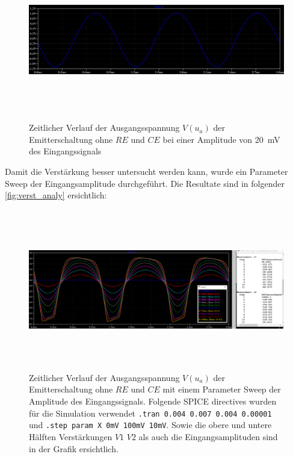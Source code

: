 \documentclass[12pt,english,ngerman]{scrartcl}
\begin{document}
\begin{figure}[H]
    \centering
    \includegraphics[width=\linewidth, height=7cm]{./figures/ohnekondundre/ausgangsignal10mv.png}
    \caption{Zeitlicher Verlauf der Ausgangsspannung $V(u_a)$
    der Emitterschaltung ohne $RE$ und $CE$ bei einer Amplitude von
  \SI{20}{mV} des Eingangssignals}
    \label{fig:sim_ohne_re_normal_ausgang}
\end{figure}

Damit die Verstärkung besser untersucht werden kann, wurde ein Parameter
Sweep der Eingangsamplitude durchgeführt. Die Resultate sind in folgender \autoref{fig:verst_analy} ersichtlich:

\begin{figure}[H]
    \centering
   \includegraphics[width=\linewidth, height=7cm]{./figures/ohnekondundre/verstaerkungsanalysis.png}
    \caption{Zeitlicher Verlauf der Ausgangsspannung $V(u_a)$
    der Emitterschaltung ohne $RE$ und $CE$ mit einem Parameter Sweep der Amplitude des Eingangssignals.
    Folgende SPICE directives wurden für die Simulation verwendet
    \texttt{.tran 0.004 0.007 0.004 0.00001} und \texttt{.step param X 0mV 100mV 10mV}. Sowie die obere und untere Hälften Verstärkungen $V1$ $V2$ als auch die Eingangsamplituden sind in der Grafik ersichtlich.}
    \label{fig:verst_analy}
\end{figure}
\end{document}
